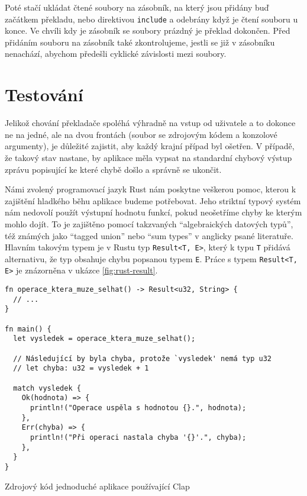 Poté stačí ukládat čtené soubory na zásobník, na který jsou přidány buď začátkem překladu, nebo direktivou \texttt{include} a odebrány když je čtení souboru u konce. Ve chvíli kdy je zásobník se soubory prázdný je překlad dokončen. Před přidáním souboru na zásobník také zkontrolujeme, jestli se již v zásobníku nenachází, abychom předešli cyklické závislosti mezi soubory.



\section{Testování}

Jelikož chování překladače spoléhá výhradně na vstup od uživatele a to dokonce ne na jedné, ale na dvou frontách (soubor se zdrojovým kódem a konzolové argumenty), je důležité zajistit, aby každý krajní případ byl ošetřen. V případě, že takový stav nastane, by aplikace měla vypsat na standardní chybový výstup zprávu popisující ke které chybě došlo a správně se ukončit.

Námi zvolený programovací jazyk Rust nám poskytne veškerou pomoc, kterou k zajištění hladkého běhu aplikace budeme potřebovat. Jeho striktní typový systém nám nedovolí použít výstupní hodnotu funkcí, pokud neošetříme chyby ke kterým mohlo dojít. To je zajištěno pomocí takzvaných ``algebraických datových typů'', též známých jako ``tagged union'' nebo ``sum types'' v anglicky psané literatuře. Hlavním takovým typem je v Rustu typ \texttt{Result<T, E>}, který k typu \texttt{T} přidává alternativu, že typ obsahuje chybu popsanou typem \texttt{E}. Práce s typem \texttt{Result<T, E>} je znázorněna v ukázce \ref{fig:rust-result}.

\begin{listing}
\begin{verbatim}
fn operace_ktera_muze_selhat() -> Result<u32, String> {
  // ...
} 

fn main() {
  let vysledek = operace_ktera_muze_selhat();
  
  // Následující by byla chyba, protože `vysledek' nemá typ u32
  // let chyba: u32 = vysledek + 1
  
  match vysledek {
    Ok(hodnota) => {
      println!("Operace uspěla s hodnotou {}.", hodnota);
    },
    Err(chyba) => {
      println!("Při operaci nastala chyba '{}'.", chyba);
    },
  }
}
\end{verbatim}
\caption{Zdrojový kód jednoduché aplikace používající Clap}
\label{fig:rust-result}
\end{listing}

